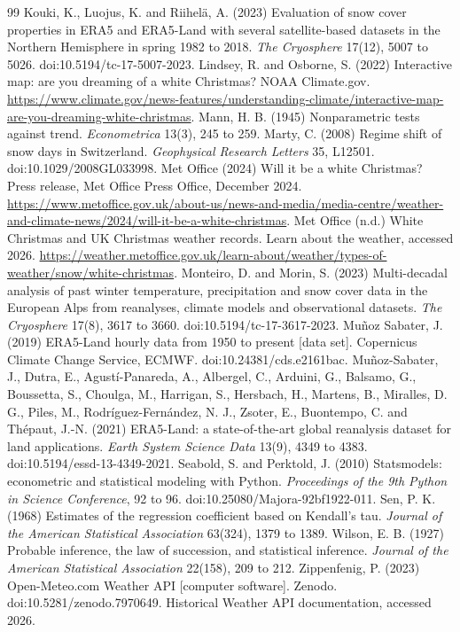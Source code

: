 \documentclass[11pt,a4paper]{article}
\begin{document}
\begin{thebibliography}{99}
 Kouki, K., Luojus, K. and Riihelä, A. (2023) Evaluation of snow cover properties in ERA5 and ERA5-Land with several satellite-based datasets in the Northern Hemisphere in spring 1982 to 2018. \textit{The Cryosphere} 17(12), 5007 to 5026. doi:10.5194/tc-17-5007-2023.
 Lindsey, R. and Osborne, S. (2022) Interactive map: are you dreaming of a white Christmas? NOAA Climate.gov. \url{https://www.climate.gov/news-features/understanding-climate/interactive-map-are-you-dreaming-white-christmas}.
 Mann, H. B. (1945) Nonparametric tests against trend. \textit{Econometrica} 13(3), 245 to 259.
 Marty, C. (2008) Regime shift of snow days in Switzerland. \textit{Geophysical Research Letters} 35, L12501. doi:10.1029/2008GL033998.
 Met Office (2024) Will it be a white Christmas? Press release, Met Office Press Office, December 2024. \url{https://www.metoffice.gov.uk/about-us/news-and-media/media-centre/weather-and-climate-news/2024/will-it-be-a-white-christmas}.
 Met Office (n.d.) White Christmas and UK Christmas weather records. Learn about the weather, accessed 2026. \url{https://weather.metoffice.gov.uk/learn-about/weather/types-of-weather/snow/white-christmas}.
 Monteiro, D. and Morin, S. (2023) Multi-decadal analysis of past winter temperature, precipitation and snow cover data in the European Alps from reanalyses, climate models and observational datasets. \textit{The Cryosphere} 17(8), 3617 to 3660. doi:10.5194/tc-17-3617-2023.
 Muñoz Sabater, J. (2019) ERA5-Land hourly data from 1950 to present [data set]. Copernicus Climate Change Service, ECMWF. doi:10.24381/cds.e2161bac.
 Muñoz-Sabater, J., Dutra, E., Agustí-Panareda, A., Albergel, C., Arduini, G., Balsamo, G., Boussetta, S., Choulga, M., Harrigan, S., Hersbach, H., Martens, B., Miralles, D. G., Piles, M., Rodríguez-Fernández, N. J., Zsoter, E., Buontempo, C. and Thépaut, J.-N. (2021) ERA5-Land: a state-of-the-art global reanalysis dataset for land applications. \textit{Earth System Science Data} 13(9), 4349 to 4383. doi:10.5194/essd-13-4349-2021.
 Seabold, S. and Perktold, J. (2010) Statsmodels: econometric and statistical modeling with Python. \textit{Proceedings of the 9th Python in Science Conference}, 92 to 96. doi:10.25080/Majora-92bf1922-011.
 Sen, P. K. (1968) Estimates of the regression coefficient based on Kendall's tau. \textit{Journal of the American Statistical Association} 63(324), 1379 to 1389.
 Wilson, E. B. (1927) Probable inference, the law of succession, and statistical inference. \textit{Journal of the American Statistical Association} 22(158), 209 to 212.
 Zippenfenig, P. (2023) Open-Meteo.com Weather API [computer software]. Zenodo. doi:10.5281/zenodo.7970649. Historical Weather API documentation, accessed 2026.
\end{thebibliography}
\end{document}
